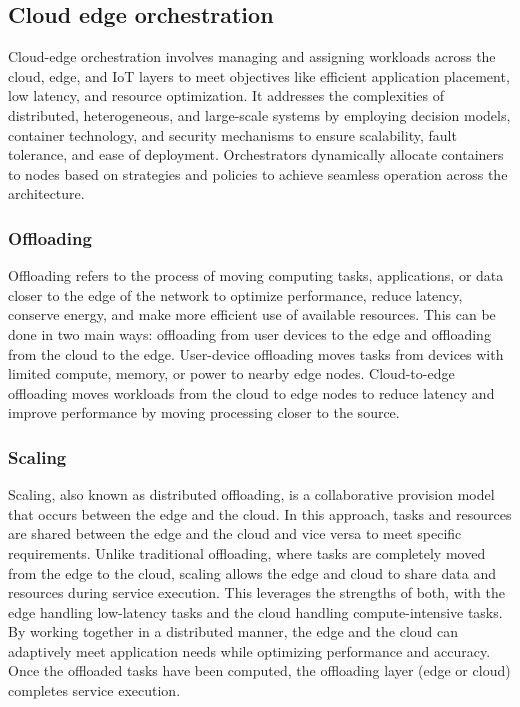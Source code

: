 %
\subsection{Cloud edge orchestration}
%
Cloud-edge orchestration involves managing and assigning workloads across the cloud, edge, and IoT layers to meet objectives like efficient application placement, low latency, and resource optimization. It addresses the complexities of distributed, heterogeneous, and large-scale systems by employing decision models, container technology, and security mechanisms to ensure scalability, fault tolerance, and ease of deployment. Orchestrators dynamically allocate containers to nodes based on strategies and policies to achieve seamless operation across the architecture.\cite{bohm_cloud-edge_2022}
%
\subsubsection{Offloading}
Offloading refers to the process of moving computing tasks, applications, or data closer to the edge of the network to optimize performance, reduce latency, conserve energy, and make more efficient use of available resources. This can be done in two main ways: offloading from user devices to the edge and offloading from the cloud to the edge. User-device offloading moves tasks from devices with limited compute, memory, or power to nearby edge nodes. Cloud-to-edge offloading moves workloads from the cloud to edge nodes to reduce latency and improve performance by moving processing closer to the source.\cite{hong_resource_2020} 
%
\subsubsection{Scaling}
Scaling, also known as distributed offloading, is a collaborative provision model that occurs between the edge and the cloud. In this approach, tasks and resources are shared between the edge and the cloud and vice versa to meet specific requirements. Unlike traditional offloading, where tasks are completely moved from the edge to the cloud, scaling allows the edge and cloud to share data and resources during service execution. This leverages the strengths of both, with the edge handling low-latency tasks and the cloud handling compute-intensive tasks. By working together in a distributed manner, the edge and the cloud can adaptively meet application needs while optimizing performance and accuracy. Once the offloaded tasks have been computed, the offloading layer (edge or cloud) completes service execution.\cite{aazam_offloading_2018}
%
